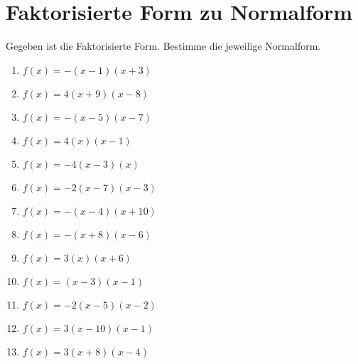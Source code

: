 \documentclass{article}%
\begin{document}
\section{Faktorisierte Form zu Normalform}%
\label{sec:FaktorisierteFormzuNormalform}%
Gegeben ist die Faktorisierte Form. Bestimme die jeweilige Normalform.%
\begin{enumerate}[label=\alph*)]%
\item%
\newline\vspace{0.5cm} $f(x)=-(x-1)(x+3)$%
\item%
\newline\vspace{0.5cm} $f(x)=4(x+9)(x-8)$%
\item%
\newline\vspace{0.5cm} $f(x)=-(x-5)(x-7)$%
\item%
\newline\vspace{0.5cm} $f(x)=4(x)(x-1)$%
\item%
\newline\vspace{0.5cm} $f(x)=-4(x-3)(x)$%
\item%
\newline\vspace{0.5cm} $f(x)=-2(x-7)(x-3)$%
\item%
\newline\vspace{0.5cm} $f(x)=-(x-4)(x+10)$%
\item%
\newline\vspace{0.5cm} $f(x)=-(x+8)(x-6)$%
\item%
\newline\vspace{0.5cm} $f(x)=3(x)(x+6)$%
\item%
\newline\vspace{0.5cm} $f(x)=(x-3)(x-1)$%
\item%
\newline\vspace{0.5cm} $f(x)=-2(x-5)(x-2)$%
\item%
\newline\vspace{0.5cm} $f(x)=3(x-10)(x-1)$%
\item%
\newline\vspace{0.5cm} $f(x)=3(x+8)(x-4)$%

\end{enumerate}
\end{document}
